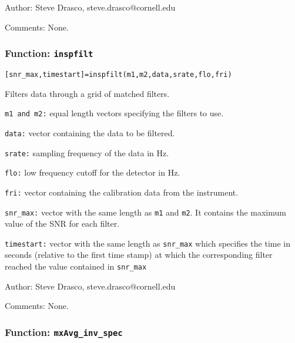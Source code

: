 \begin{description}
\item{Author:} Steve Drasco, steve.drasco@cornell.edu
\item{Comments:} None.
\end{description}


\subsubsection{Function: {\tt inspfilt}}
\label{sss:inspfilt}

\texttt{[snr\_max,timestart]=inspfilt(m1,m2,data,srate,flo,fri)}

Filters data through a grid of matched filters.

\begin{description}
\item{\tt m1 and m2:} equal length vectors specifying the
filters to use.

\item{\tt data:} vector containing the data to be filtered.

\item{\tt srate:} sampling frequency of the data in Hz.

\item{\tt flo:} low frequency cutoff for the detector in Hz.

\item{\tt fri:} vector containing the calibration data from the instrument.

\item{\tt snr\_max:} vector with the same length as \texttt{m1} and
\texttt{m2}. It contains the maximum value of the SNR for each filter.

\item{\tt timestart:} vector with the same length as \texttt{snr\_max}
which specifies the time in seconds (relative to the first time stamp) at
which the corresponding filter reached the value contained in \texttt{snr\_max}
\end{description}

\begin{description}
\item{Author:} Steve Drasco, steve.drasco@cornell.edu
\item{Comments:} None.
\end{description}

\subsubsection{Function: {\tt mxAvg\_inv\_spec}}
\label{sss:max_avg_inv_spec}

